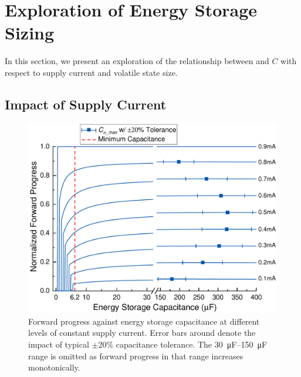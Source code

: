 \section{Exploration of Energy Storage Sizing} \label{sec:c3_exploration}


In this section, we present an exploration of the relationship between  and $C$ with respect to supply current  and volatile state size.

\subsection{Impact of Supply Current} \label{subsec:sizees}

\begin{figure}
    \centering
    \includegraphics[width=\columnwidth]{ch3_sizingeffect/figures/StorCCur6Fig} 
    \caption{Forward progress against energy storage capacitance at different levels of constant supply current. Error bars around  denote the impact of typical $\pm$20\% capacitance tolerance. The \SIrange{30}{150}{\micro\farad} range is omitted as forward progress in that range increases monotonically. }
    \label{fig:fpwconstcurr}
\end{figure}

